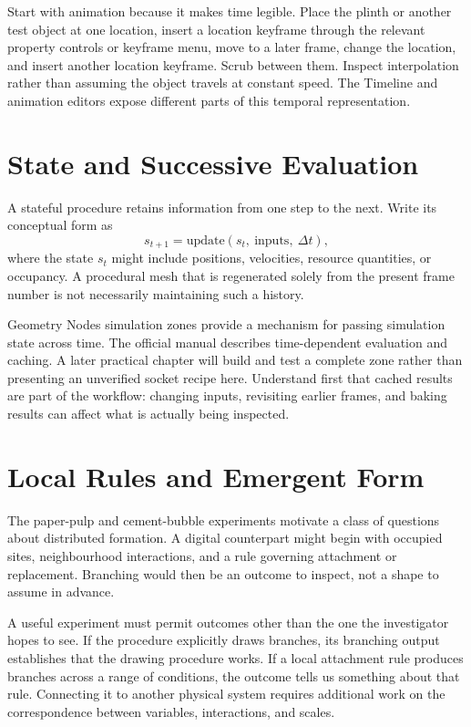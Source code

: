 \documentclass[11pt,openany]{book}
\begin{document}
Start with animation because it makes time legible. Place the plinth or another test object at one location, insert a location keyframe through the relevant property controls or keyframe menu, move to a later frame, change the location, and insert another location keyframe. Scrub between them. Inspect interpolation rather than assuming the object travels at constant speed. The Timeline and animation editors expose different parts of this temporal representation.

\section{State and Successive Evaluation}

A stateful procedure retains information from one step to the next. Write its conceptual form as
\[
  s_{t+1} = \mathrm{update}(s_t,\ \text{inputs},\ \Delta t),
\]
where the state $s_t$ might include positions, velocities, resource quantities, or occupancy. A procedural mesh that is regenerated solely from the present frame number is not necessarily maintaining such a history.

Geometry Nodes simulation zones provide a mechanism for passing simulation state across time. The official manual describes time-dependent evaluation and caching. A later practical chapter will build and test a complete zone rather than presenting an unverified socket recipe here. Understand first that cached results are part of the workflow: changing inputs, revisiting earlier frames, and baking results can affect what is actually being inspected.

\section{Local Rules and Emergent Form}

The paper-pulp and cement-bubble experiments motivate a class of questions about distributed formation. A digital counterpart might begin with occupied sites, neighbourhood interactions, and a rule governing attachment or replacement. Branching would then be an outcome to inspect, not a shape to assume in advance.

A useful experiment must permit outcomes other than the one the investigator hopes to see. If the procedure explicitly draws branches, its branching output establishes that the drawing procedure works. If a local attachment rule produces branches across a range of conditions, the outcome tells us something about that rule. Connecting it to another physical system requires additional work on the correspondence between variables, interactions, and scales.
\end{document}
